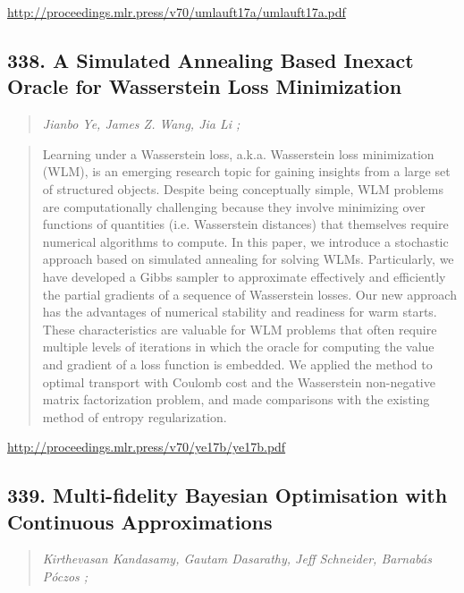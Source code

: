 \documentclass{article}
\begin{document}
\href{http://proceedings.mlr.press/v70/umlauft17a/umlauft17a.pdf}{http://proceedings.mlr.press/v70/umlauft17a/umlauft17a.pdf}

\subsection{338. A Simulated Annealing Based Inexact Oracle for Wasserstein Loss Minimization}

\begin{quote}
\footnotesize{\textit{Jianbo Ye, James Z. Wang, Jia Li ;}}
\end{quote}

\begin{quote}
    Learning under a Wasserstein loss, a.k.a. Wasserstein loss minimization (WLM), is an emerging research topic for gaining insights from a large set of structured objects. Despite being conceptually simple, WLM problems are computationally challenging because they involve minimizing over functions of quantities (i.e. Wasserstein distances) that themselves require numerical algorithms to compute. In this paper, we introduce a stochastic approach based on simulated annealing for solving WLMs. Particularly, we have developed a Gibbs sampler to approximate effectively and efficiently the partial gradients of a sequence of Wasserstein losses. Our new approach has the advantages of numerical stability and readiness for warm starts. These characteristics are valuable for WLM problems that often require multiple levels of iterations in which the oracle for computing the value and gradient of a loss function is embedded. We applied the method to optimal transport with Coulomb cost and the Wasserstein non-negative matrix factorization problem, and made comparisons with the existing method of entropy regularization.  \end{quote}

\href{http://proceedings.mlr.press/v70/ye17b/ye17b.pdf}{http://proceedings.mlr.press/v70/ye17b/ye17b.pdf}

\subsection{339. Multi-fidelity Bayesian Optimisation with Continuous Approximations}

\begin{quote}
\footnotesize{\textit{Kirthevasan Kandasamy, Gautam Dasarathy, Jeff Schneider, Barnabás Póczos ;}}
\end{quote}
\end{document}
